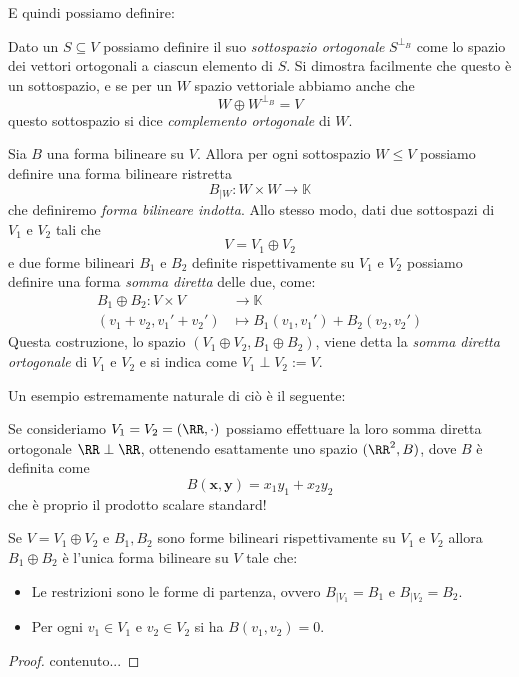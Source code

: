 \documentclass[11pt]{scrartcl}
\newcommand{\KK}{\mathbb{K}}
\begin{document}
	E quindi possiamo definire:
	\begin{definition}
		Dato un $S\subseteq V$ possiamo definire il suo \textit{sottospazio ortogonale} $S^{\perp_B}$ come lo spazio dei vettori ortogonali a ciascun elemento di $S$. Si dimostra facilmente che questo è un sottospazio, e se per un $W$ spazio vettoriale abbiamo anche che
		$$W\oplus W^{\perp_B}=V$$
		questo sottospazio si dice \textit{complemento ortogonale} di $W$. 
	\end{definition}
	\begin{definition}
		Sia $B$ una forma bilineare su $V$. Allora per ogni sottospazio $W\le V$ possiamo definire una forma bilineare ristretta
		$$B_{\mid W}:W\times W \to \KK$$
		che definiremo \textit{forma bilineare indotta}. Allo stesso modo, dati due sottospazi di $V_1$ e $V_2$ tali che
		$$V=V_1\oplus V_2$$
		e due forme bilineari $B_1$ e $B_2$ definite rispettivamente su $V_1$ e $V_2$ possiamo definire una forma \textit{somma diretta} delle due, come:
		\begin{align*}
			B_1\oplus B_2 : V\times V & \to \KK \\
			(v_1+v_2,v_1'+v_2') & \mapsto B_1(v_1,v_1')+B_2(v_2,v_2')
		\end{align*}
		Questa costruzione, lo spazio $(V_1\oplus V_2,B_1\oplus B_2)$, viene detta la \textit{somma diretta ortogonale} di $V_1$ e $V_2$ e si indica come $V_1\perp V_2:= V$.
	\end{definition}
	Un esempio estremamente naturale di ciò è il seguente:
	\begin{example}
		Se consideriamo $V_1=V_2=\left(\RR,\cdot\right)$ possiamo effettuare la loro somma diretta ortogonale $\RR\perp\RR$, ottenendo esattamente uno spazio $(\RR^2,B)$, dove $B$ è definita come
		$$B(\mathbf{x},\mathbf{y})=x_1y_1+x_2y_2$$
		che è proprio il prodotto scalare standard! 
	\end{example}
	\begin{proposition}
		Se $V=V_1\oplus V_2$ e $B_1,B_2$ sono forme bilineari rispettivamente su $V_1$ e $V_2$ allora $B_1\oplus B_2$ è l'unica forma bilineare su $V$ tale che:
		\begin{itemize}
			\item Le restrizioni sono le forme di partenza, ovvero $B_{\mid V_1}=B_1$ e $B_{\mid V_2}=B_2$. 
			\item Per ogni $v_1\in V_1$ e $v_2\in V_2$ si ha $B(v_1,v_2)=0$.
		\end{itemize}
	\end{proposition}
	\begin{proof}
		contenuto...
	\end{proof}
\end{document}
